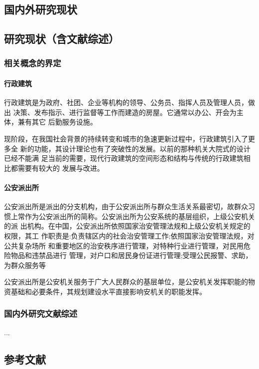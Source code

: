 \documentclass[AutoFakeBold]{ZafuResearchProposal}
\begin{document}
\begin{RPSectionBox}
    \section{国内外研究现状}
    \subsection{研究现状（含文献综述）}
    \subsubsection{相关概念的界定}
    \paragraph{行政建筑}
    行政建筑是为政府、社团、企业等机构的领导、公务员、指挥人员及管理人员，做出 决策、发布指示、进行监督等工作而建造的房屋。它通常以办公、开会为主体，兼有其它 后勤服务设施。\par
    现阶段，在我国社会背景的持续转变和城市的急速更新过程中，行政建筑引入了更多全 新的功能，其设计理论也有了突破性的发展。以前的那种机关大院式的设计已经不能满 足当前的需要，现代行政建筑的空间形态和结构与传统的行政建筑相比都需要有较大的 发展与改进。
    \paragraph{公安派出所}
    公安派出所是派出的分支机构，由于公安派出所与群众生活关系最密切，故群众习
    惯上常作为公安派出所的简称。公安派出所为公安系统的基层组织，上级公安机关的派 出机构。在中国，公安派出所依照国家治安管理法规和上级公安机关规定的权限，其工 作职责是:负责辖区内的社会治安管理工作;依照国家治安管理法规，对公共复杂场所 和重要地区的治安秩序进行管理，对特种行业进行管理，对民用危险物品和违禁品进行 管理，对户口和居民身份证进行管理;受理公民报警、求助，为群众服务等\par
    公安派出所是公安机关服务于广大人民群众的基层单位，是公安机关发挥职能的物 资基础和必要条件，其规划建设水平直接影响安机关的职能发挥。
    \subsubsection{国内外研究文献综述}
    ...

\end{RPSectionBox}

\begin{RPSectionBox}
    \section{参考文献}
\end{RPSectionBox}
\end{document}
